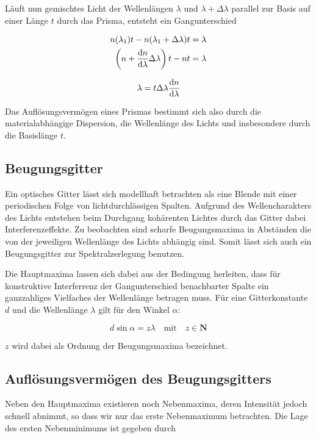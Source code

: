 \documentclass[a4paper,german,12pt,smallheadings]{scrartcl}
\begin{document}
Läuft nun gemischtes Licht der Wellenlängen $\lambda$ und $\lambda + \Delta
\lambda$ parallel zur Basis auf einer Länge $t$ durch das Prisma, entsteht ein
Gangunterschied

\begin{align}
  n(\lambda_1) t - n(\lambda_1 + \Delta \lambda) t &= \lambda \\
  \del{ n + \frac{\dif n}{\dif \lambda} \Delta \lambda}t - nt &= \lambda
\end{align}

\begin{equation}
  \lambda = t \Delta \lambda \frac{\dif n}{\dif \lambda}
\end{equation}

Das Auflösungsvermögen eines Prismas bestimmt sich also durch die
materialabhängige Dispersion, die Wellenlänge des Lichts und insbesondere durch
die Basislänge $t$.

\subsection{Beugungsgitter}

Ein optisches Gitter lässt sich modellhaft betrachten als eine Blende mit einer
periodischen Folge von lichtdurchlässigen Spalten. Aufgrund des
Wellencharakters des Lichts entstehen beim Durchgang kohärenten Lichtes durch
das Gitter dabei Interferenzeffekte. Zu beobachten sind scharfe Beugungsmaxima
in Abständen die von der jeweiligen Wellenlänge des Lichts abhängig sind. Somit
lässt sich auch ein Beugungsgitter zur Spektralzerlegung benutzen.

Die Hauptmaxima lassen sich dabei aus der Bedingung herleiten, dass für
konstruktive Interferrenz der Gangunterschied benachbarter Spalte ein
ganzzahliges Vielfaches der Wellenlänge betragen muss. Für eine Gitterkonstante
$d$ und die Wellenlänge $\lambda$ gilt für den Winkel $\alpha$:

\begin{equation}
  d \sin \alpha = z \lambda \quad \text{mit} \quad z \in \mathbf{N}
\end{equation}

$z$ wird dabei als Ordnung der Beugungsmaxima bezeichnet.

\subsection{Auflösungsvermögen des Beugungsgitters}

Neben den Hauptmaxima existieren noch Nebenmaxima, deren Intensität jedoch
schnell abnimmt, so dass wir nur das erste Nebenmaximum betrachten. Die Lage
des ersten Nebenminimums ist gegeben durch
\end{document}
